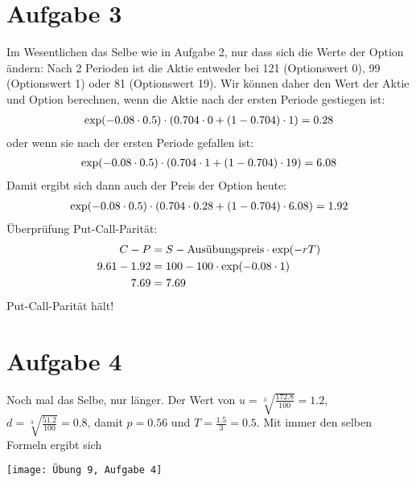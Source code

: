 \documentclass{article}
\begin{document}
	\section*{Aufgabe 3}
	Im Wesentlichen das Selbe wie in Aufgabe 2, nur dass sich die Werte der Option ändern: Nach 2 Perioden ist die Aktie entweder bei 121 (Optionswert 0), 99 (Optionswert 1) oder 81 (Optionswert 19). Wir können daher den Wert der Aktie und Option berechnen, wenn die Aktie nach der ersten Periode gestiegen ist:
	\begin{align}
		\exp(-0.08\cdot 0.5)\cdot (0.704\cdot 0 + (1-0.704)\cdot 1) = 0.28 \notag
	\end{align}
	oder wenn sie nach der ersten Periode gefallen ist:
	\begin{align}
		\exp(-0.08\cdot 0.5)\cdot (0.704\cdot 1 + (1-0.704)\cdot 19) = 6.08 \notag
	\end{align}
	Damit ergibt sich dann auch der Preis der Option heute:
	\begin{align}
		\exp(-0.08\cdot 0.5)\cdot (0.704\cdot 0.28 + (1-0.704)\cdot 6.08) = 1.92 \notag
	\end{align}
	Überprüfung Put-Call-Parität:
	\begin{align}
		C-P &= S - \text{Ausübungspreis}\cdot \exp(-rT) \notag \\
		9.61 - 1.92 &= 100 - 100\cdot\exp(-0.08\cdot 1) \notag \\
		7.69 &= 7.69 \notag
	\end{align}
	Put-Call-Parität hält!
	
	\section*{Aufgabe 4}
	Noch mal das Selbe, nur länger. Der Wert von $u = \sqrt[3]{\frac{172.8}{100}} = 1.2$, $d=\sqrt[3]{\frac{51.2}{100}}=0.8$, damit $p=0.56$ und $T=\frac{1.5}{3}=0.5$. Mit immer den selben Formeln ergibt sich
	\begin{center}
		\texttt{[image: Übung 9, Aufgabe 4]}
	\end{center}
	
\end{document}
